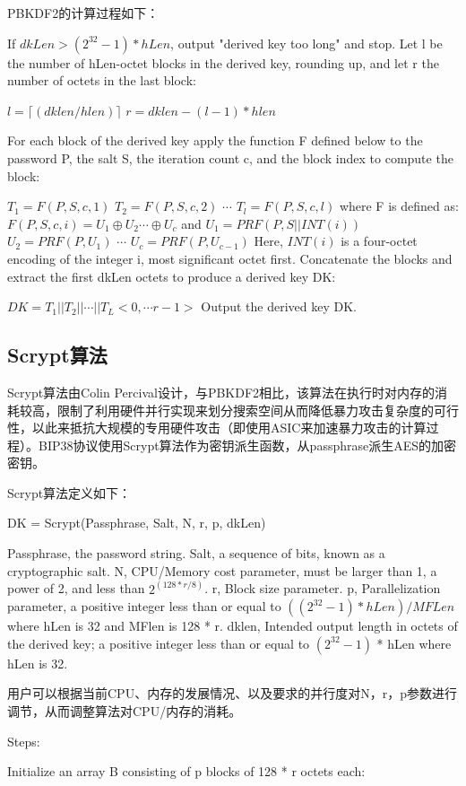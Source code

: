 PBKDF2的计算过程如下：

If $dkLen > (2^{32} - 1) * hLen$, output "derived key too long" and stop.
Let l be the number of hLen-octet blocks in the derived key, rounding up, and let r the number of octets in the last block:

$ l=\lceil (dklen/hlen) \rceil $  
$r=dklen -(l-1)*hlen$

For each block of the derived key apply the function F defined below to the password P, the salt S, the iteration count c, and the block index to compute the block:

$T_1=F(P,S,c,1)$
$T_2=F(P,S,c,2)$
$\cdots$
$T_l=F(P,S,c,l)$  
where F is defined as:
$F(P,S,c,i)=U_1 \oplus U_2  \cdots \oplus U_c$  
and   
$U_1=PRF(P,S||INT(i))$  
$U_2=PRF(P,U_1)$  
$\cdots$  
$U_c=PRF(P,U_{c-1})$  
Here, $INT (i)$ is a four-octet encoding of the integer i, most significant octet first.  
Concatenate the blocks and extract the first dkLen octets to produce a derived key DK:   
 
$DK=T_1||T_2||\cdots|| T_L<0,\cdots r-1>$
Output the derived key DK.

\subsection{Scrypt算法}
Scrypt算法由Colin Percival设计，与PBKDF2相比，该算法在执行时对内存的消耗较高，限制了利用硬件并行实现来划分搜索空间从而降低暴力攻击复杂度的可行性，以此来抵抗大规模的专用硬件攻击（即使用ASIC来加速暴力攻击的计算过程）。BIP38协议使用Scrypt算法作为密钥派生函数，从passphrase派生AES的加密密钥。 
 
Scrypt算法定义如下：

DK = Scrypt(Passphrase, Salt, N, r, p, dkLen)  

Passphrase, the password string.
Salt, a sequence of bits, known as a cryptographic salt.
N, CPU/Memory cost parameter, must be larger than 1, a power of 2, and less than $2^{(128 * r / 8)}$.
r, Block size parameter.
p, Parallelization parameter, a positive integer less than or equal to $((2^{32}-1) * hLen) / MFLen$ where hLen is 32 and MFlen is 128 * r.
dklen, Intended output length in octets of the derived key; a positive integer less than or equal to $(2^{32} - 1)$ * hLen where hLen is 32.

用户可以根据当前CPU、内存的发展情况、以及要求的并行度对N，r，p参数进行调节，从而调整算法对CPU/内存的消耗。

Steps:

Initialize an array B consisting of p blocks of 128 * r octets each:

